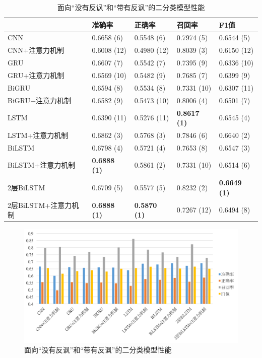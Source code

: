 \begin{table}[htb]
  \centering
  \begin{minipage}[t]{\linewidth}
  \caption{面向“没有反讽”和“带有反讽”的二分类模型性能}
  \label{tab:exp_irony_det_A_single_result}
    \begin{tabularx}{\linewidth}{X|llll}
    \toprule[1.5pt]
    & 准确率 & 正确率 & 召回率 & F1值 \\
    \hline
    CNN & 0.6658 (6) & 0.5548 (6) & 0.7974 (5) & 0.6544 (5) \\ %
    CNN+注意力机制 & 0.6008 (12) & 0.4980 (12) & 0.8039 (3) & 0.6150 (12) \\  %
    \hline
    GRU & 0.6607 (7) & 0.5542 (7) & 0.7395 (9) & 0.6336 (10) \\ %
    GRU+注意力机制 & 0.6569 (10) & 0.5482 (9) & 0.7685 (7) & 0.6399 (9) \\ %
    \hline
    BiGRU & 0.6594 (8) & 0.5534 (8) & 0.7331 (10) & 0.6307 (11) \\ %
    BiGRU+注意力机制 & 0.6582 (9) & 0.5473 (10) & 0.8006 (4) & 0.6501 (7) \\ %
    \hline
    LSTM & 0.6390 (11) & 0.5276 (11) & \bf 0.8617 (1) & 0.6545 (4) \\ %
    LSTM+注意力机制 & 0.6862 (3) & 0.5768 (3) & 0.7846 (6) & 0.6640 (2) \\ %
    \hline
    BiLSTM & 0.6798 (4) & 0.5721 (4) & 0.7653 (8) & 0.6547 (3) \\ %
    BiLSTM+注意力机制 & \bf 0.6888 (1) & 0.5861 (2) & 0.7331 (10) & 0.6514 (6) \\ %
    \hline
    2层BiLSTM & 0.6709 (5) & 0.5577 (5) & 0.8232 (2) & \bf 0.6649 (1) \\ %
    2层BiLSTM+注意力机制 & \bf 0.6888 (1) & \bf 0.5870 (1) & 0.7267 (12) & 0.6494 (8) \\ %
    \bottomrule[1.5pt]
    \end{tabularx}
  \end{minipage}
\end{table}

\begin{figure}[H]
  \centering
  \includegraphics[width=\textwidth]{img/exp_irony_det_A_single_result_bar.png}
  \caption{面向“没有反讽”和“带有反讽”的二分类模型性能}
  \label{fig:exp_irony_det_A_single_result_bar}
\end{figure}

